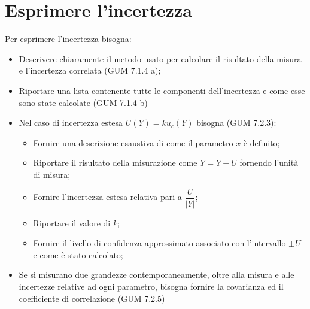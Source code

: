 \documentclass[a4paper, 15pt]{article}
\begin{document}
\section{Esprimere l'incertezza}
\begin{adjustwidth}{2in}{}   	
   		Per esprimere l'incertezza bisogna: 
   		\begin{itemize}
   			\item Descrivere chiaramente il metodo usato per calcolare il risultato della misura
   			e l’incertezza correlata (GUM 7.1.4 a);
   			\item Riportare una lista contenente tutte le componenti dell’incertezza e come
   			esse sono state calcolate (GUM 7.1.4 b)
   			\item Nel caso di incertezza estesa $ U(Y) = ku_c(Y) $ bisogna (GUM 7.2.3):
   			\begin{itemize}
   				\item Fornire una descrizione esaustiva di come il parametro $ x $ è definito;
   				\item Riportare il risultato della misurazione come $Y = \overline{Y} \pm U$ fornendo l’unità di misura;
   				\item Fornire l’incertezza estesa relativa pari a $\dfrac{U}{|Y|}$;
   				\item Riportare il valore di $ k $;
   				\item Fornire il livello di confidenza approssimato associato con l’intervallo $ \pm U $ e come è
   				stato calcolato;    				
   			\end{itemize}
   			\item Se si misurano due grandezze contemporaneamente, oltre alla misura e alle
   			incertezze relative ad ogni parametro, bisogna fornire la covarianza ed il
   			coefficiente di correlazione (GUM 7.2.5)
   		\end{itemize}
\end{adjustwidth}
\end{document}
